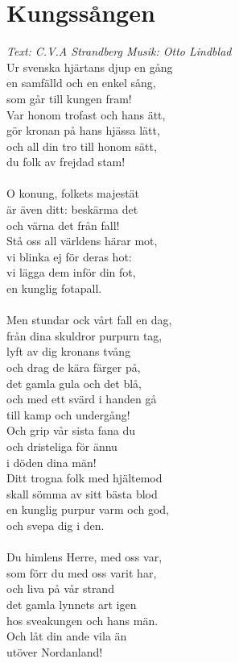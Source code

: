 \section{Kungssången}
\textit{Text: C.V.A Strandberg \hspace{5mm} Musik: Otto Lindblad}
\vspace{2mm}\\
Ur svenska hjärtans djup en gång \\
en samfälld och en enkel sång,\\
som går till kungen fram!\\
Var honom trofast och hans ätt,\\
gör kronan på hans hjässa lätt,\\
och all din tro till honom sätt,\\
du folk av frejdad stam!\\
\\
O konung, folkets majestät\\
är även ditt: beskärma det\\
och värna det från fall!\\
Stå oss all världens härar mot,\\
vi blinka ej för deras hot:\\
vi lägga dem inför din fot,\\
en kunglig fotapall.\\
\\
Men stundar ock vårt fall en dag,\\
från dina skuldror purpurn tag,\\
lyft av dig kronans tvång\\
och drag de kära färger på,\\
det gamla gula och det blå,\\
och med ett svärd i handen gå\\
till kamp och undergång!\\
\newpage
\noindent Och grip vår sista fana du\\
och dristeliga för ännu\\
i döden dina män!\\
Ditt trogna folk med hjältemod\\
skall sömma av sitt bästa blod\\
en kunglig purpur varm och god,\\
och svepa dig i den.\\
\\
Du himlens Herre, med oss var,\\
som förr du med oss varit har,\\
och liva på vår strand\\
det gamla lynnets art igen\\
hos sveakungen och hans män.\\
Och låt din ande vila än\\
utöver Nordanland!
\newpage
